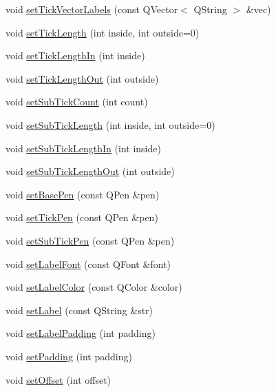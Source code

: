 \begin{DoxyCompactItemize}
\item 
void \hyperlink{class_q_c_p_axis_a921d3ba3853ca3bd2cce3459f7a243ed}{set\+Tick\+Vector\+Labels} (const Q\+Vector$<$ Q\+String $>$ \&vec)
\item 
void \hyperlink{class_q_c_p_axis_a62ec40bebe3540e9c1479a8fd2be3b0d}{set\+Tick\+Length} (int inside, int outside=0)
\item 
void \hyperlink{class_q_c_p_axis_afae1a37a99611366275a51204d991739}{set\+Tick\+Length\+In} (int inside)
\item 
void \hyperlink{class_q_c_p_axis_a3b8a0debd1ffedd2c22d0592dfbb4e62}{set\+Tick\+Length\+Out} (int outside)
\item 
void \hyperlink{class_q_c_p_axis_a4b1554ead9d7f9799650d51383e326dd}{set\+Sub\+Tick\+Count} (int count)
\item 
void \hyperlink{class_q_c_p_axis_ab702d6fd42fc620607435339a1c2a2e1}{set\+Sub\+Tick\+Length} (int inside, int outside=0)
\item 
void \hyperlink{class_q_c_p_axis_ac46fa2a993a9f5789540977610acf1de}{set\+Sub\+Tick\+Length\+In} (int inside)
\item 
void \hyperlink{class_q_c_p_axis_a4c6dfc3963492ed72a77724012df5f23}{set\+Sub\+Tick\+Length\+Out} (int outside)
\item 
void \hyperlink{class_q_c_p_axis_a778d45fb71b3c7ab3bb7079e18b058e4}{set\+Base\+Pen} (const Q\+Pen \&pen)
\item 
void \hyperlink{class_q_c_p_axis_ad80923bcc1c5da4c4db602c5325e797e}{set\+Tick\+Pen} (const Q\+Pen \&pen)
\item 
void \hyperlink{class_q_c_p_axis_aede4028ae7516bd51a60618a8233f9cf}{set\+Sub\+Tick\+Pen} (const Q\+Pen \&pen)
\item 
void \hyperlink{class_q_c_p_axis_a71ac1a47f7547e490a8c4311d1433cf3}{set\+Label\+Font} (const Q\+Font \&font)
\item 
void \hyperlink{class_q_c_p_axis_a6c906fe56d75f0122335b9f79b999608}{set\+Label\+Color} (const Q\+Color \&color)
\item 
void \hyperlink{class_q_c_p_axis_a33bcc382c111c9f31bb0687352a2dea4}{set\+Label} (const Q\+String \&str)
\item 
void \hyperlink{class_q_c_p_axis_a4391192a766e5d20cfe5cbc17607a7a2}{set\+Label\+Padding} (int padding)
\item 
void \hyperlink{class_q_c_p_axis_a5691441cb3de9e9844855d339c0db279}{set\+Padding} (int padding)
\item 
void \hyperlink{class_q_c_p_axis_a04a652603cbe50eba9969ee6d68873c3}{set\+Offset} (int offset)

\end{DoxyCompactItemize}
